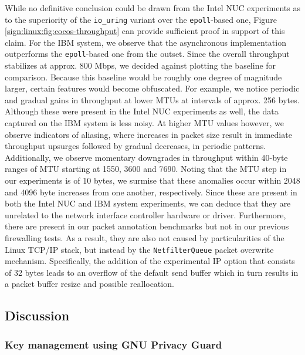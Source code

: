 While no definitive conclusion could be drawn from the Intel NUC experiments as to the superiority of the \texttt{io\_uring} variant over the \texttt{epoll}-based one, Figure \ref{sign:linux:fig:cocos-throughput} can provide sufficient proof in support of this claim. For the IBM system, we observe that the asynchronous implementation outperforms the \texttt{epoll}-based one from the outset. Since the overall throughput stabilizes at approx. 800 Mbps, we decided against plotting the baseline for comparison. Because this baseline would be roughly one degree of magnitude larger, certain features would become obfuscated. For example, we notice periodic and gradual gains in throughput at lower MTUs at intervals of approx. 256 bytes. Although these were present in the Intel NUC experiments as well, the data captured on the IBM system is less noisy. At higher MTU values however, we observe indicators of aliasing, where increases in packet size result in immediate throughput upsurges followed by gradual decreases, in periodic patterns. Additionally, we observe momentary downgrades in throughput within 40-byte ranges of MTU starting at 1550, 3600 and 7690. Noting that the MTU step in our experiments is of 10 bytes, we surmise that these anomalies occur within 2048 and 4096 byte increases from one another, respectively. Since these are present in both the Intel NUC and IBM system experiments, we can deduce that they are unrelated to the network interface controller hardware or driver. Furthermore, there are present in our packet annotation benchmarks but not in our previous firewalling tests. As a result, they are also not caused by particularities of the Linux TCP/IP stack, but instead by the \texttt{NetfilterQueue} packet overwrite mechanism. Specifically, the addition of the experimental IP option that consists of 32 bytes leads to an overflow of the default send buffer which in turn results in a packet buffer resize and possible reallocation.

\subsection{Discussion}
\label{sign:linux:discussion}

\subsubsection{Key management using GNU Privacy Guard}
\label{sign:linux:discussion:gpg}

